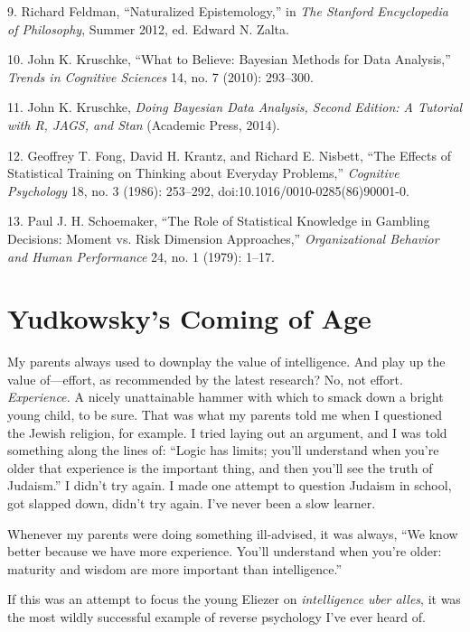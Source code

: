 {
 9. Richard Feldman, ``Naturalized
Epistemology,'' in \textit{The Stanford Encyclopedia
of Philosophy}, Summer 2012, ed. Edward N. Zalta.}

{
 10. John K. Kruschke, ``What to Believe: Bayesian
Methods for Data Analysis,'' \textit{Trends in
Cognitive Sciences} 14, no. 7 (2010): 293--300.}

{
 11. John K. Kruschke, \textit{Doing Bayesian Data Analysis, Second
Edition: A Tutorial with R, JAGS, and Stan} (Academic Press, 2014).}

{
 12. Geoffrey T. Fong, David H. Krantz, and Richard E. Nisbett,
``The Effects of Statistical Training on Thinking
about Everyday Problems,'' \textit{Cognitive
Psychology} 18, no. 3 (1986): 253--292,
doi:10.1016/0010-0285(86)90001-0.}

{
 13. Paul J. H. Schoemaker, ``The Role of
Statistical Knowledge in Gambling Decisions: Moment vs. Risk Dimension
Approaches,'' \textit{Organizational Behavior and
Human Performance} 24, no. 1 (1979): 1--17.}

\chapter{Yudkowsky's Coming of Age}


{
 My parents always used to downplay the value of intelligence. And
play up the value of---effort, as recommended by the latest research?
No, not effort. \textit{Experience.} A nicely unattainable hammer with
which to smack down a bright young child, to be sure. That was what my
parents told me when I questioned the Jewish religion, for example. I
tried laying out an argument, and I was told something along the lines
of: ``Logic has limits; you'll
understand when you're older that experience is the
important thing, and then you'll see the truth of
Judaism.'' I didn't try again. I made
one attempt to question Judaism in school, got slapped down,
didn't try again. I've never been a
slow learner. }

{
 Whenever my parents were doing something ill-advised, it was
always, ``We know better because we have more
experience. You'll understand when
you're older: maturity and wisdom are more important
than intelligence.''}

{
 If this was an attempt to focus the young Eliezer on
\textit{intelligence uber alles}, it was the most wildly successful
example of reverse psychology I've ever heard of.}

